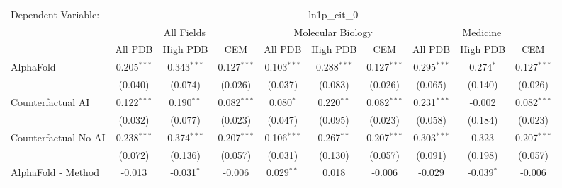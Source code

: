 \begingroup
\centering
\begin{tabular}{lccccccccc}
   \tabularnewline \midrule \midrule
   Dependent Variable: & \multicolumn{9}{c}{ln1p\_cit\_0}\\
 & \multicolumn{3}{c}{All Fields} & \multicolumn{3}{c}{Molecular Biology} & \multicolumn{3}{c}{Medicine} \\
\cmidrule(lr){2-7} \cmidrule(lr){5-10} \cmidrule(lr){8-7}
 & \multicolumn{1}{c}{All PDB} & \multicolumn{1}{c}{High PDB} & \multicolumn{1}{c}{CEM} & \multicolumn{1}{c}{All PDB} & \multicolumn{1}{c}{High PDB} & \multicolumn{1}{c}{CEM} & \multicolumn{1}{c}{All PDB} & \multicolumn{1}{c}{High PDB} & \multicolumn{1}{c}{CEM} \\
\cmidrule(lr){2-3} \cmidrule(lr){3-4} \cmidrule(lr){4-5} \cmidrule(lr){5-6} \cmidrule(lr){6-7} \cmidrule(lr){7-8} \cmidrule(lr){8-9} \cmidrule(lr){9-10} \cmidrule(lr){10-3}
   AlphaFold                                                   & 0.205$^{***}$ & 0.343$^{***}$ & 0.127$^{***}$ & 0.103$^{***}$  & 0.288$^{***}$  & 0.127$^{***}$ & 0.295$^{***}$ & 0.274$^{*}$   & 0.127$^{***}$\\   
                                                               & (0.040)       & (0.074)       & (0.026)       & (0.037)        & (0.083)        & (0.026)       & (0.065)       & (0.140)       & (0.026)\\   
   Counterfactual AI                                           & 0.122$^{***}$ & 0.190$^{**}$  & 0.082$^{***}$ & 0.080$^{*}$    & 0.220$^{**}$   & 0.082$^{***}$ & 0.231$^{***}$ & -0.002        & 0.082$^{***}$\\   
                                                               & (0.032)       & (0.077)       & (0.023)       & (0.047)        & (0.095)        & (0.023)       & (0.058)       & (0.184)       & (0.023)\\   
   Counterfactual No AI                                        & 0.238$^{***}$ & 0.374$^{***}$ & 0.207$^{***}$ & 0.106$^{***}$  & 0.267$^{**}$   & 0.207$^{***}$ & 0.303$^{***}$ & 0.323         & 0.207$^{***}$\\   
                                                               & (0.072)       & (0.136)       & (0.057)       & (0.031)        & (0.130)        & (0.057)       & (0.091)       & (0.198)       & (0.057)\\   
   AlphaFold - Method                                          & -0.013        & -0.031$^{*}$  & -0.006        & 0.029$^{**}$   & 0.018          & -0.006        & -0.029        & -0.039$^{*}$  & -0.006\\   

\end{tabular}
